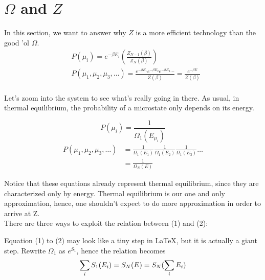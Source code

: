 




    \section{\mathsection $\Omega$ and $Z$}
    \newcommand{\ThE}{thermal equilibrium}
        
        In this section, we want to answer why $Z$ is a more efficient technology than the good 'ol $\Omega$.
        \begin{align*}
            &P(\mu_i) = e^{-\beta E_i}
            \left( \frac{Z_{N-1}(\beta)}{Z_N(\beta)}\right)\\
            &P(\mu_1,\mu_2,\mu_3,\ldots) = \frac{e^{-\beta E_1} e^{-\beta E_2} e^{-\beta E_3} \cdots}{Z(\beta)}
                              = \frac{e^{-\beta E} }{Z(\beta)}\\
        \end{align*}

        Let's zoom into the system to see what's really going in there.
        As usual, in \ThE, the probability of a microstate only depends on its energy.

            \[P(\mu_i) = \frac1{\Omega_1(E_{\mu_i})} \]
        \begin{align}
            P(\mu_1,\mu_2,\mu_3,\ldots) &= \frac1{\Omega_1(E_1)}
                                \frac1{\Omega_1(E_2)}
                                \frac1{\Omega_1(E_3)}
                                \ldots \\
            &= \frac1{\Omega_N(E)}
        \end{align}

        Notice that these equations already represent thermal equilibrium,
        since they are characterized only by energy.
        Thermal equilibrium is our one and only approximation,
        hence, one shouldn't expect to do more approximation in order to arrive at Z.\\
        There are three ways to exploit the relation between (1) and (2):

        \newcommand{\aE}{\epsilon}
        \newcommand{\soi}{\sum_i}
        \newcommand{\Stothei}[1] {{\hat\pdc}^{#1} S_1(\aE)}
        Equation (1) to (2) may look like a tiny step in \LaTeX,
        but it is actually a giant step.
        Rewrite $\Omega_1$ as $e^{ S_1}$, hence the relation becomes
        \[
        \soi S_1(E_i) = S_N(E) = S_N(\soi E_i) \\
            \]


